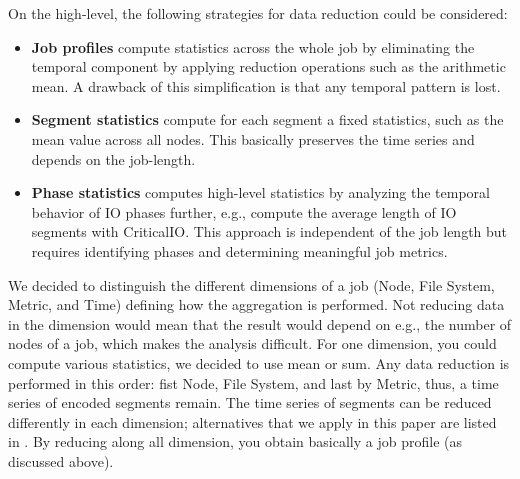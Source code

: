 \documentclass{jhps}
\begin{document}
On the high-level, the following strategies for data reduction could be considered:
\begin{itemize}
	\item \textbf{Job profiles} compute statistics across the whole job by eliminating the temporal component by applying reduction operations such as the arithmetic mean.
		A drawback of this simplification is that any temporal pattern is lost.
	\item \textbf{Segment statistics} compute for each segment a fixed statistics, such as the mean value across all nodes.
		This basically preserves the time series and depends on the job-length.
	\item \textbf{Phase statistics} computes high-level statistics by analyzing the temporal behavior of IO phases further, e.g., compute the average length of IO segments with CriticalIO.
		This approach is independent of the job length but requires identifying phases and determining meaningful job metrics.
\end{itemize}

We decided to distinguish the different dimensions of a job (Node, File System, Metric, and Time) defining how the aggregation is performed.
Not reducing data in the dimension would mean that the result would depend on e.g., the number of nodes of a job, which makes the analysis difficult.
For one dimension, you could compute various statistics, we decided to use mean or sum.
Any data reduction is performed in this order: fist Node, File System, and last by Metric, thus, a time series of encoded segments remain.
The time series of segments can be reduced differently in each dimension; alternatives that we apply in this paper are listed in .
By reducing along all dimension, you obtain basically a job profile (as discussed above).
\end{document}
